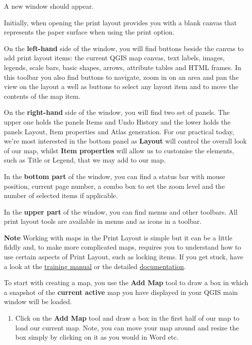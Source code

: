 \documentclass[
]{book}
\providecommand{\tightlist}{%
  \setlength{\itemsep}{0pt}\setlength{\parskip}{0pt}}
\begin{document}
A new window should appear.

Initially, when opening the print layout provides you with a blank canvas that represents the paper surface when using the print option.

On the \textbf{left-hand} side of the window, you will find buttons beside the canvas to add print layout items: the current QGIS map canvas, text labels, images, legends, scale bars, basic shapes, arrows, attribute tables and HTML frames. In this toolbar you also find buttons to navigate, zoom in on an area and pan the view on the layout a well as buttons to select any layout item and to move the contents of the map item.

On the \textbf{right-hand} side of the window, you will find two set of panels. The upper one holds the panels Items and Undo History and the lower holds the panels Layout, Item properties and Atlas generation. For our practical today, we're most interested in the bottom panel as \textbf{Layout} will control the overall look of our map, whilst \textbf{Item properties} will allow us to customise the elements, such as Title or Legend, that we may add to our map.

In the \textbf{bottom part} of the window, you can find a status bar with mouse position, current page number, a combo box to set the zoom level and the number of selected items if applicable.

In the \textbf{upper part} of the window, you can find menus and other toolbars. All print layout tools are available in menus and as icons in a toolbar.

\textbf{Note}
Working with maps in the Print Layout is simple but it can be a little fiddly and, to make more complicated maps, requires you to understand how to use certain aspects of Print Layout, such as locking items. If you get stuck, have a look at the \href{https://docs.qgis.org/3.22/en/docs/training_manual/map_composer/map_composer.html}{training manual} or the detailed \href{https://docs.qgis.org/3.22/en/docs/user_manual/print_composer/index.html}{documentation}.

To start with creating a map, you use the \textbf{Add Map} tool to draw a box in which a snapshot of the \textbf{current active} map you have displayed in your QGIS main window will be loaded.

\begin{enumerate}
\def\labelenumi{\arabic{enumi}.}
\tightlist
\item
  Click on the \textbf{Add Map} tool and draw a box in the first half of our map to load our current map. Note, you can move your map around and resize the box simply by clicking on it as you would in Word etc.
\end{enumerate}
\end{document}

